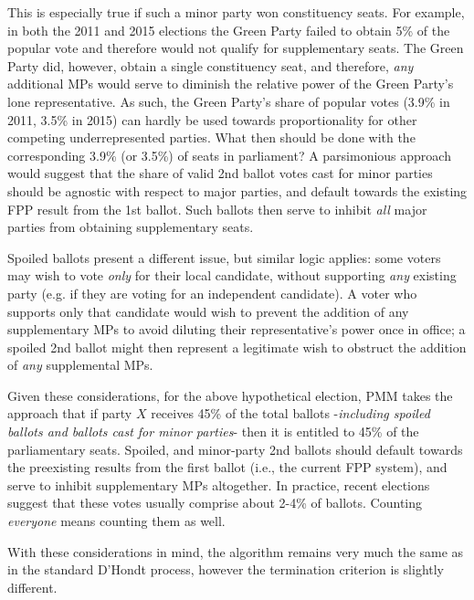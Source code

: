 This is especially true if such a minor party won constituency seats. For example, in both the 2011 and 2015 elections the Green Party failed to obtain 5\% of the popular vote and therefore would not qualify for supplementary seats. The Green Party did, however, obtain a single constituency seat, and therefore, \emph{any} additional MPs would serve to diminish the relative power of the Green Party's lone representative.
As such, the Green Party’s share of popular votes (3.9\% in 2011, 3.5\% in 2015) can hardly be used towards proportionality for other competing underrepresented parties. What then should be done with the corresponding 3.9\% (or 3.5\%) of seats in parliament? 
A parsimonious approach would suggest that the share of valid 2nd ballot votes cast for minor parties should be agnostic with respect to major parties, and default towards the existing FPP result from the 1st ballot. Such ballots then serve to inhibit \emph{all} major parties from obtaining supplementary seats.

Spoiled ballots present a different issue, but similar logic applies: some voters may wish to vote \emph{only} for their local candidate, without supporting \emph{any} existing party (e.g. if they are voting for an independent candidate).
A voter who supports only that candidate would wish to prevent the addition of any supplementary MPs to avoid diluting their representative's power once in office; a spoiled 2nd ballot might then represent a legitimate wish to obstruct the addition of \emph{any} supplemental MPs.

Given these considerations, for the above hypothetical election, PMM takes the approach that if party $X$ receives 45\% of the total ballots \--\emph{including spoiled ballots and ballots cast for minor parties}\-- then it is entitled to 45\% of the parliamentary seats.
Spoiled, and minor-party 2nd ballots should default towards the preexisting results from the first ballot (i.e., the current FPP system), and serve to inhibit supplementary MPs altogether.
In practice, recent elections suggest that these votes usually comprise about 2-4\% of ballots. Counting \emph{everyone} means counting them as well.

With these considerations in mind, the algorithm remains very much the same as in the standard D'Hondt process, however the termination criterion is slightly different.

